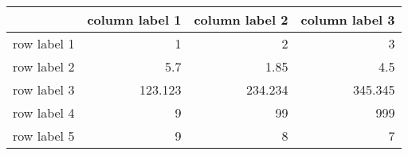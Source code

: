 \begin{tabular}{lrrr} 
\toprule 
  	 & 	 column label 1 	 & 	 column label 2 	 & 	 column label 3 \\ 
\midrule 
row label 1 	 & 	 1 	 & 	 2 	 & 	 3 \\ 
row label 2 	 & 	 5.7 	 & 	 1.85 	 & 	 4.5 \\ 
row label 3 	 & 	 123.123 	 & 	 234.234 	 & 	 345.345 \\ 
row label 4 	 & 	 9 	 & 	 99 	 & 	 999 \\ 
row label 5 	 & 	 9 	 & 	 8 	 & 	 7 \\ 
\bottomrule 
\end{tabular}